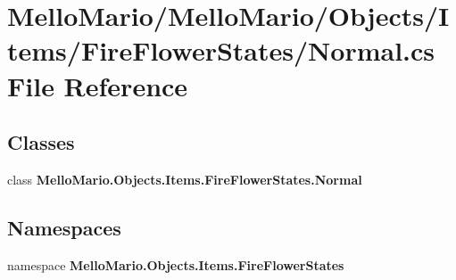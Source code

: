 \section{Mello\+Mario/\+Mello\+Mario/\+Objects/\+Items/\+Fire\+Flower\+States/\+Normal.cs File Reference}
\label{Items_2FireFlowerStates_2Normal_8cs}
\subsection*{Classes}
\begin{DoxyCompactItemize}
\item 
class \textbf{ Mello\+Mario.\+Objects.\+Items.\+Fire\+Flower\+States.\+Normal}
\end{DoxyCompactItemize}
\subsection*{Namespaces}
\begin{DoxyCompactItemize}
\item 
namespace \textbf{ Mello\+Mario.\+Objects.\+Items.\+Fire\+Flower\+States}
\end{DoxyCompactItemize}
